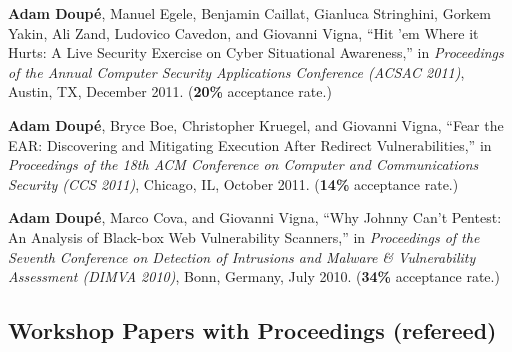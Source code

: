 \documentclass[11pt,letterpaper,sans]{moderncv}
\begin{document}
\begin{etaremune}
\item \textbf{Adam Doup\'e}, Manuel Egele, Benjamin Caillat, Gianluca
  Stringhini, Gorkem Yakin, Ali Zand, Ludovico Cavedon, and Giovanni
  Vigna, ``Hit 'em Where it Hurts: A Live Security Exercise on Cyber
  Situational Awareness,'' in \emph{Proceedings of the Annual Computer
    Security Applications Conference (ACSAC 2011)}, Austin, TX,
  December 2011. (\textbf{20\%} acceptance rate.)

\item \textbf{Adam Doup\'e}, Bryce Boe, Christopher Kruegel, and
  Giovanni Vigna, ``Fear the EAR: Discovering and Mitigating Execution
  After Redirect Vulnerabilities,'' in \emph{Proceedings of the 18th
    ACM Conference on Computer and Communications Security (CCS
    2011)}, Chicago, IL, October 2011. (\textbf{14\%} acceptance rate.)

\item \textbf{Adam Doup\'e}, Marco Cova, and Giovanni Vigna, ``Why
  Johnny Can't Pentest: An Analysis of Black-box Web Vulnerability
  Scanners,'' in \emph{Proceedings of the Seventh Conference on
    Detection of Intrusions and Malware \& Vulnerability Assessment
    (DIMVA 2010)}, Bonn, Germany, July 2010. (\textbf{34\%} acceptance rate.)
  
\end{etaremune}

\subsection{Workshop Papers with Proceedings (refereed)}
\end{document}
